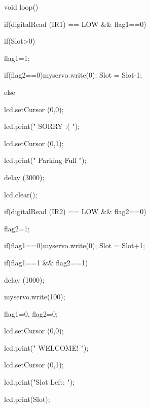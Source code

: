 void loop(){ 



if(digitalRead (IR1) == LOW && flag1==0){

if(Slot>0){flag1=1;

if(flag2==0){myservo.write(0); Slot = Slot-1;}

}else{

lcd.setCursor (0,0);

lcd.print("    SORRY :(    ");  

lcd.setCursor (0,1);

lcd.print("  Parking Full  "); 

delay (3000);

lcd.clear(); 

}

}



if(digitalRead (IR2) == LOW && flag2==0){flag2=1;

if(flag1==0){myservo.write(0); Slot = Slot+1;}

}



if(flag1==1 && flag2==1){

delay (1000);

myservo.write(100);

flag1=0, flag2=0;

}



lcd.setCursor (0,0);

lcd.print("    WELCOME!    ");

lcd.setCursor (0,1);

lcd.print("Slot Left: ");

lcd.print(Slot);

}
